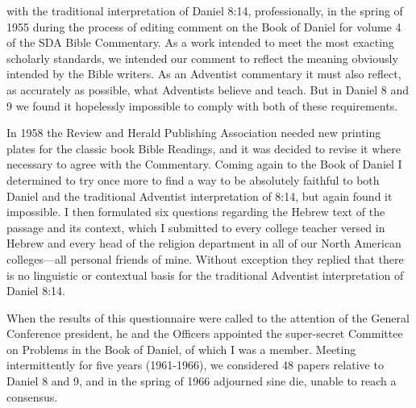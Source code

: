  with the traditional interpretation of Daniel
8:14, professionally, in the spring of 1955 during the process of editing
comment on the Book of Daniel for volume 4 of the SDA Bible Commentary. As
a work intended to meet the most exacting scholarly standards, we intended
our comment to reflect the meaning obviously intended by the Bible writers.
As an Adventist commentary it must also reflect, as accurately as possible,
what Adventists believe and teach. But in Daniel 8 and 9 we found it
hopelessly impossible to comply with both of these requirements.

In 1958 the Review and Herald Publishing Association needed new printing
plates for the classic book Bible Readings, and it was decided to revise it
where necessary to agree with the Commentary. Coming again to the Book of
Daniel I determined to try once more to find a way to be absolutely faithful
to both Daniel and the traditional Adventist interpretation of 8:14, but
again found it impossible. I then formulated six questions regarding the
Hebrew text of the passage and its context, which I submitted to every
college teacher versed in Hebrew and every head of the religion department 
in all of our North American colleges---all personal friends of mine.
Without exception they replied that there is no linguistic or contextual
basis for the traditional Adventist interpretation of Daniel 8:14.

When the results of this questionnaire were called to the attention of the
General Conference president, he and the Officers appointed the super-secret
Committee on Problems in the Book of Daniel, of which I was a member.
Meeting intermittently for five years (1961-1966), we considered 48 papers
relative to Daniel 8 and 9, and in the spring of 1966 adjourned sine die,
unable to reach a consensus.


